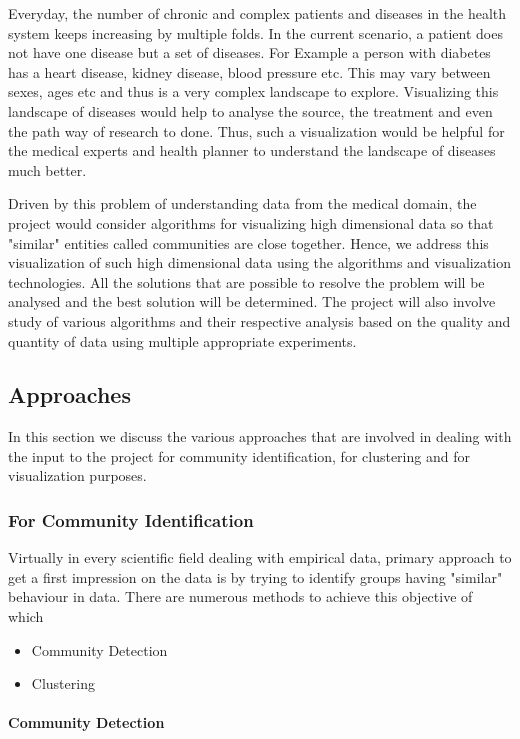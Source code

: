 \par Everyday, the number of chronic and complex patients and diseases in the health system keeps
increasing by multiple folds. In the current scenario, a patient does not have one disease but a
set of diseases. For Example a person with diabetes has a heart disease, kidney disease, blood
pressure etc. This may vary between sexes, ages etc and thus is a very complex landscape to
explore. Visualizing this landscape of diseases would help to analyse the source, the treatment
and even the path way of research to done. Thus, such a visualization would be helpful for the
medical experts and health planner to understand the landscape of diseases much better.
\par Driven by this problem of understanding data from the medical domain, the project would consider algorithms for visualizing high dimensional data so that "similar" entities called
communities are close together. Hence, we address this visualization of such high dimensional data using the algorithms and visualization technologies. All the solutions that are possible to resolve the problem will be analysed and the best solution will be determined. The project will also involve study of various algorithms and their respective analysis based on the quality and quantity of data using multiple appropriate experiments. 
\subsection{Approaches}
In this section we discuss the various approaches that are involved in dealing with the input to the project for community identification, for clustering and for visualization purposes. 
\subsubsection{For Community Identification}
Virtually in every scientific field dealing with empirical data, primary approach to get a first impression on the data is by trying to identify groups having "similar" behaviour in data. There are numerous methods to achieve this objective of which 

\begin{itemize}
\item Community Detection
\item Clustering
\end{itemize}

\paragraph{Community Detection}
